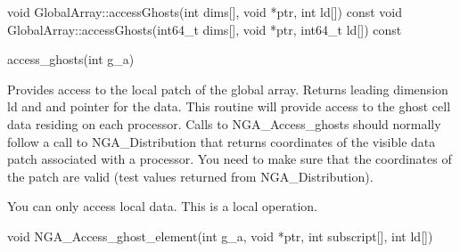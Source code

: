 \documentclass[12pt]{article}
\begin{document}
\begin{cxxapi}
\begin{cxxcode}
void GlobalArray::accessGhosts(int dims[], void *ptr, int ld[]) const
void GlobalArray::accessGhosts(int64_t dims[], void *ptr, int64_t ld[]) const
\end{cxxcode}
\begin{funcargs}
\end{funcargs}
\end{cxxapi}

\begin{pyapi}
\begin{pycode}
access_ghosts(int g_a)
\end{pycode}
\begin{funcargs}
\end{funcargs}
\end{pyapi}
\local

\begin{desc}

  Provides access to the local patch of the global array. Returns
  leading dimension ld and and pointer for the data.  This routine
  will provide access to the ghost cell data residing on each
  processor. Calls to NGA_Access_ghosts should normally follow a call
  to NGA_Distribution that returns coordinates of the visible data
  patch associated with a processor. You need to make sure that the
  coordinates of the patch are valid (test values returned from
  NGA_Distribution).

You can only access local data.
This is a local operation.

\end{desc}


\begin{capi}
\begin{ccode}
void NGA_Access_ghost_element(int g_a, void *ptr, int subscript[],
                              int ld[])
\end{ccode}
\begin{funcargs}
\end{funcargs}
\end{capi}
\end{document}
